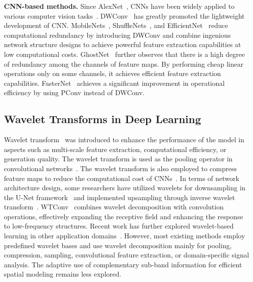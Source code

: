 \documentclass[a4paper,fleqn]{cas-dc}
\begin{document}
\textbf{CNN-based methods.}
Since AlexNet~\cite{krizhevsky2012imagenet}, CNNs have been widely applied to various computer vision tasks~\cite{redmon2016you,long2015fully,bolya2019yolact,dong2015image,wang2023hierarchical,ding2023exploring}. DWConv~\cite{chollet2017xception} has greatly promoted the lightweight development of CNN. MobileNets~\cite{howard2017mobilenets,sandler2018mobilenetv2,wadekar2022mobilevitv3}, ShuffleNets~\cite{zhang2018shufflenet,ma2018shufflenet}, and EfficientNet~\cite{tan2019rethinking} reduce computational redundancy by introducing DWConv and combine ingenious network structure designs to achieve powerful feature extraction capabilities at low computational costs. GhostNet~\cite{han2020ghostnet} further observes that there is a high degree of redundancy among the channels of feature maps. By performing cheap linear operations only on some channels, it achieves efficient feature extraction capabilities. FasterNet~\cite{chen2023run} achieves a significant improvement in operational efficiency by using PConv instead of DWConv.


\subsection{Wavelet Transforms in Deep Learning}

Wavelet transform~\cite{daubechies1992ten} was introduced to enhance the performance of the model in aspects such as multi-scale feature extraction, computational efficiency, or generation quality. The wavelet transform is used as the pooling operator in convolutional networks~\cite{duan2017sar,williams2018wavelet}. The wavelet transform is also employed to compress feature maps to reduce the computational cost of CNNs~\cite{finder2022wavelet}. In terms of network architecture design, some researchers have utilized wavelets for downsampling in the U-Net framework~\cite{ronneberger2015u} and implemented upsampling through inverse wavelet transform~\cite{liu2018multi,alaba2022wcnn3d}. 
WTConv~\cite{finder2024wavelet} combines wavelet decomposition with convolution operations, effectively expanding the receptive field and enhancing the response to low-frequency structures.
{\color{blue}
Recent work has further explored wavelet-based learning in other application domains~\cite{pillai2025wavelet}.
}
{\color{blue}
However, most existing methods employ predefined wavelet bases and use wavelet decomposition mainly for pooling, compression, sampling, convolutional feature extraction, or domain-specific signal analysis. The adaptive use of complementary sub-band information for efficient spatial modeling remains less explored.
}
\end{document}
